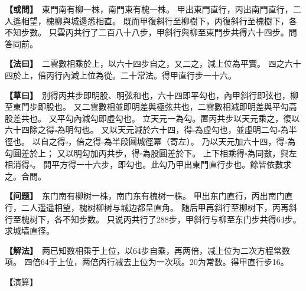 \documentclass[11pt,a4paper]{article}
\let\origsquare\square
\renewcommand{\square}{\ensuremath{\origsquare}}%
\newcommand{\clOWEN}[1]{%
  \par\vspace{0.3em}%
  \noindent\textcolor{problemcolor}{\textbf{【或問】}}\,{\tradfont #1}\par\nopagebreak%
}
\newcommand{\mdOWEN}[1]{%
  \par\vspace{0.3em}%
  \noindent\textcolor{problemcolor}{\textbf{【问题】}}\,{\modfont #1}\par\nopagebreak%
}
\newcommand{\clFAYUE}[1]{%
  \par\noindent\textcolor{methodcolor}{\textbf{【法曰】}}\,{\tradfont #1}\par\nopagebreak%
}
\newcommand{\mdFAYUE}[1]{%
  \par\noindent\textcolor{methodcolor}{\textbf{【解法】}}\,{\modfont #1}\par\nopagebreak%
}
\newcommand{\clTSAOYUE}[1]{%
  \par\noindent\textcolor{workcolor}{\textbf{【草曰】}}\,{\tradfont #1}\par%
}
\newcommand{\mdTSAOYUE}[1]{%
  \par\noindent\textcolor{workcolor}{\textbf【演算】}}\,{\modfont #1}\par%
\begin{document}
\begin{paracol}{2}

\begin{leftcolumn}
\clOWEN{%
東門南有柳一株，南門東有槐一株。
甲出東門直行，丙出南門直行，二人遙相望，槐柳與城邊悉相直。
既而甲復斜行至柳樹下，丙復斜行至槐樹下，各不知步數。
只雲丙共行了二百八十八步，甲斜行與柳至東門步共得六十四步。問答同前。}

\clFAYUE{%
二雲數相乘於上，以六十四步自之，又二之，減上位為平實。
四之六十四於上，倍丙行內減上位為從。二十常法。得甲直行步一十六。}

\clTSAOYUE{%
別得丙共步即明股、明弦和也，六十四即平勾也，內甲斜行即弦也，柳至東門步即股也。
又二雲數相並即明差與極弦共也，二雲數相減即明差與平勾高股差共也。
又平勾內減勾即虛勾也。
立天元一為勾。置丙共步以天元乘之，復以六十四除之得$\square$為明勾也。
又以天元減於六十四，得$\square$為虛勾也，並虛明二勾$\square$為半徑也。
以自之得$\square$，倍之得$\square$為半段圓城徑冪（寄左）。
乃以天元加六十四，得$\square$為勾圓差於上；
又以明勾加丙共步，得$\square$為股圓差於下。
上下相乘得$\square$為同數，與左相消得$\square$。
開平方得一十六步，即勾也。此勾乃甲出東門直行步也。餘皆依數求之。合問。}
\end{leftcolumn}

\switchcolumn

\begin{rightcolumn}
\mdOWEN{%
东门南有柳树一株，南门东有槐树一株。
甲出东门直行，丙出南门直行，二人遥遥相望，槐树柳树与城边都呈直角。
随后甲再斜行至柳树下，丙再斜行至槐树下，各不知步数。
只说丙共行了288步，甲斜行与柳至东门步共得64步。求城墙直径。}

\mdFAYUE{%
两已知数相乘于上位，以64步自乘，再两倍，减上位为二次方程常数项。
四倍64于上位，两倍丙行减去上位为一次项。20为常数。得甲直行步16。}

\mdTSAOYUE{%
辨识得：丙共步即明股、明弦之和，64即平勾，其中甲斜行即弦，柳至东门步即股。
两已知数之和即明差与极弦之和，相减即明差与平勾高股差之和。
平勾减去勾即虚勾。
设天元一为勾。取丙共步以天元乘之，再以64除得$\square$为明勾。
又以天元从64中减去得$\square$为虚勾，虚勾与明勾相加$\square$为半径。
自乘得$\square$，翻倍得$\square$为半段圆城径冪（寄左）。
以天元加64得$\square$为勾圆差于上位；
又以明勾加丙共步得$\square$为股圆差于下位。
上下相乘得$\square$为同数，与左式相消得$\square$。
开平方得16步，即勾。此勾即甲出东门直行步。其余依数求之。符合所问。}
\end{rightcolumn}

\end{paracol}
\end{document}
